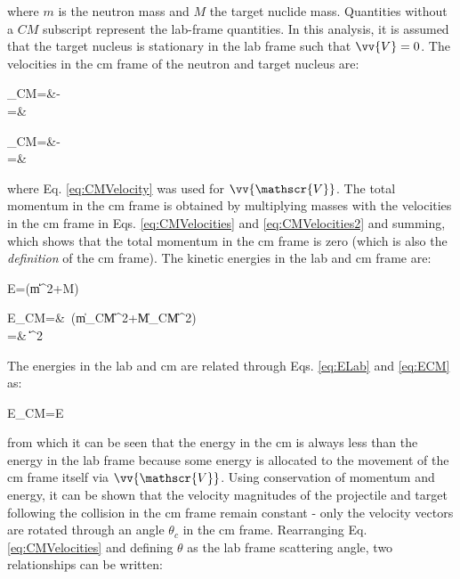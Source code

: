 \beq
\label{eq:CMVelocity}
\equiv{}
\eeq

where \(m\) is the neutron mass and \(M\) the target nuclide mass. Quantities without a \(CM\) subscript represent the lab-frame quantities. In this analysis, it is assumed that the target nucleus is stationary in the lab frame such that \(\vv{V}=0\). The velocities in the \gls{cm} frame of the neutron and target nucleus are:

\beqa
\label{eq:CMVelocities}
_{CM}=&-\\
=&
\eeqa

\beqa
\label{eq:CMVelocities2}
_{CM}=&-\\
=&
\eeqa

where Eq. \eqref{eq:CMVelocity} was used for \(\vv{\mathscr{V}}\). The total momentum in the \gls{cm} frame is obtained by multiplying masses with the velocities in the \gls{cm} frame in Eqs. \eqref{eq:CMVelocities} and \eqref{eq:CMVelocities2} and summing, which shows that the total momentum in the \gls{cm} frame is zero (which is also the {\it definition} of the \gls{cm} frame). The kinetic energies in the lab and \gls{cm} frame are:

\beq
\label{eq:ELab}
E=\left(m\|\|^2+M\right)
\eeq

\beqa
\label{eq:ECM}
E_{CM}=&\ \left(m\|_{CM}\|^2+M\|_{CM}\|^2\right)\\
=&\ \|\|^2
\eeqa

The energies in the lab and \gls{cm} are related through Eqs. \eqref{eq:ELab} and \eqref{eq:ECM} as:

\beq
E_{CM}=E
\eeq

from which it can be seen that the energy in the \gls{cm} is always less than the energy in the lab frame because some energy is allocated to the movement of the \gls{cm} frame itself via \(\vv{\mathscr{V}}\). Using conservation of momentum and energy, it can be shown that the velocity magnitudes of the projectile and target following the collision in the \gls{cm} frame remain constant - only the velocity vectors are rotated through an angle \(\theta_c\) in the \gls{cm} frame. Rearranging Eq. \eqref{eq:CMVelocities} and defining \(\theta\) as the lab frame scattering angle, two relationships can be written:

